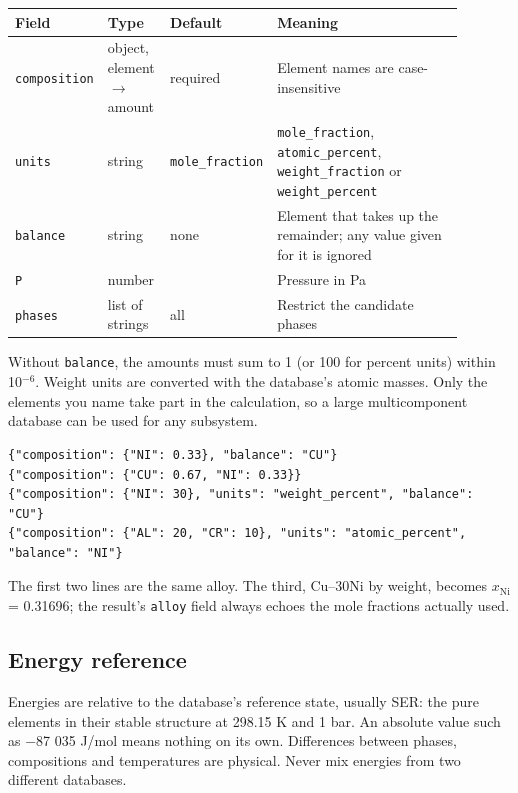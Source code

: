 \documentclass[12pt,a4paper]{article}
\begin{document}
\begingroup\small
\begin{longtable}{>{\raggedright\arraybackslash}p{0.161\linewidth}>{\raggedright\arraybackslash}p{0.148\linewidth}>{\raggedright\arraybackslash}p{0.121\linewidth}>{\raggedright\arraybackslash}p{0.464\linewidth}}
\toprule
\textbf{Field} & \textbf{Type} & \textbf{Default} & \textbf{Meaning} \\
\midrule
\endhead
\texttt{composition} & object, element \(\rightarrow\) amount & required & Element names are case-insensitive \\
\texttt{units} & string & \texttt{mole\_\allowbreak{}fraction} & \texttt{mole\_\allowbreak{}fraction}, \texttt{atomic\_\allowbreak{}percent}, \texttt{weight\_\allowbreak{}fraction} or \texttt{weight\_\allowbreak{}percent} \\
\texttt{balance} & string & none & Element that takes up the remainder; any value given for it is ignored \\
\texttt{P} & number & 101325 & Pressure in Pa \\
\texttt{phases} & list of strings & all & Restrict the candidate phases \\
\bottomrule
\end{longtable}
\endgroup
Without \texttt{balance}, the amounts must sum to 1 (or 100 for percent units) within 10\(^{-6}\). Weight units are converted with the database's atomic masses. Only the elements you name take part in the calculation, so a large multicomponent database can be used for any subsystem.

\begin{lstlisting}[basicstyle={\footnotesize\ttfamily}]
{"composition": {"NI": 0.33}, "balance": "CU"}
{"composition": {"CU": 0.67, "NI": 0.33}}
{"composition": {"NI": 30}, "units": "weight_percent", "balance": "CU"}
{"composition": {"AL": 20, "CR": 10}, "units": "atomic_percent", "balance": "NI"}
\end{lstlisting}
The first two lines are the same alloy. The third, Cu--30Ni by weight, becomes \(x_{\mathrm{Ni}}\) = 0.31696; the result's \texttt{alloy} field always echoes the mole fractions actually used.


\subsection*{Energy reference}
Energies are relative to the database's reference state, usually SER: the pure elements in their stable structure at 298.15 K and 1 bar. An absolute value such as \(-\)87 035 J/mol means nothing on its own. Differences between phases, compositions and temperatures are physical. Never mix energies from two different databases.
\end{document}
